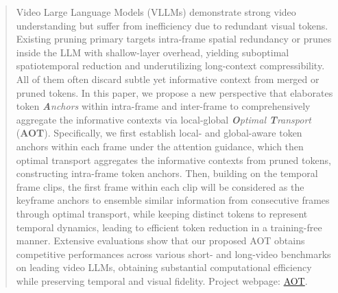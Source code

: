\begin{abstract}

Video Large Language Models (VLLMs) demonstrate strong video understanding but suffer from inefficiency due to redundant visual tokens. Existing pruning primary targets intra-frame spatial redundancy or prunes inside the LLM with shallow-layer overhead, yielding suboptimal spatiotemporal reduction and underutilizing long-context compressibility. All of them often discard subtle yet informative context from merged or pruned tokens. In this paper, we propose a new perspective that elaborates token \textit{\textbf{A}nchors} within intra-frame and inter-frame to comprehensively aggregate the informative contexts via local-global \textit{\textbf{O}ptimal} \textit{\textbf{T}ransport} (\textbf{AOT}). Specifically, we first establish local- and global-aware token anchors within each frame under the attention guidance, which then optimal transport aggregates the informative contexts from pruned tokens, constructing intra-frame token anchors. Then, building on the temporal frame clips, the first frame within each clip will be considered as the keyframe anchors to ensemble similar information from consecutive frames through optimal transport, while keeping distinct tokens to represent temporal dynamics, leading to efficient token reduction in a training-free manner. Extensive evaluations show that our proposed AOT obtains competitive performances across various short- and long-video benchmarks on leading video LLMs, obtaining substantial computational efficiency while preserving temporal and visual fidelity. Project webpage: \href{https://tyroneli.github.io/AOT}{AOT}.

\end{abstract}
